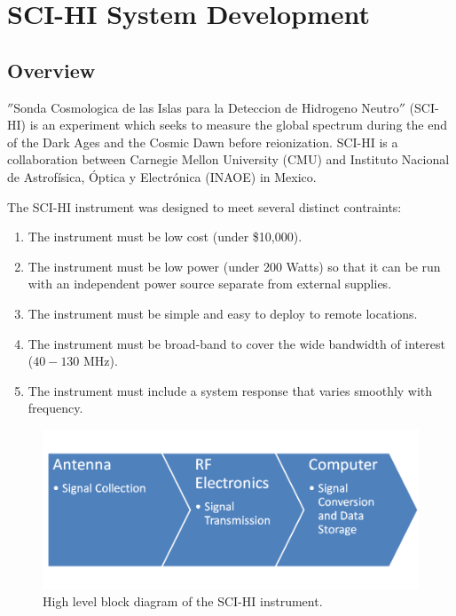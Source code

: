 \chapter{SCI-HI System Development}\label{Ch:System}



\section{Overview} \label{Sec:sysover}

$''$Sonda Cosmologica de las Islas para la Deteccion de Hidrogeno Neutro$''$ (SCI-HI) is an experiment which seeks to measure the \cm global spectrum during the end of the Dark Ages and the Cosmic Dawn before reionization. SCI-HI is a collaboration between Carnegie Mellon University (CMU) and Instituto Nacional de Astrof\'{i}sica, \'{O}ptica y Electr\'{o}nica (INAOE) in Mexico.  

The SCI-HI instrument was designed to meet several distinct contraints:

\begin{enumerate}
\item The instrument must be low cost (under \$10,000).

\item The instrument must be low power (under  200 Watts) so that it can be run with an independent power source separate from external supplies. 

\item The instrument must be simple and easy to deploy to remote locations. 

\item The instrument must be broad-band to cover the wide bandwidth of interest ($40-130$ MHz).

\item The instrument must include a system response that varies smoothly with frequency. 

\end{enumerate}

\begin{figure}[bht]
\begin{center}
\includegraphics[width=0.9\linewidth]{SCIHI_system/figures/basic_block_diagram.png}
\caption{High level block diagram of the SCI-HI instrument.}
\label{Fig:basic_block_diagram}
\end{center}
\end{figure}

